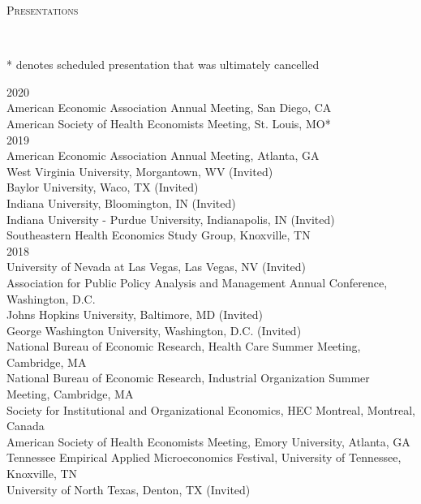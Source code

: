 \documentclass[9pt]{article}
\newenvironment{changemargin}[2]{%
  \begin{list}{}{%
    \setlength{\topsep}{0pt}%
    \setlength{\leftmargin}{#1}%
    \setlength{\rightmargin}{#2}%
    \setlength{\listparindent}{\parindent}%
    \setlength{\itemindent}{\parindent}%
    \setlength{\parsep}{\parskip}%
  }%
  \item[]}{\end{list}
}
\newcommand{\lineover}{
	\begin{changemargin}{-0.05in}{-0.05in}
		\vspace*{-8pt}
		\hrulefill \\
		\vspace*{-2pt}
	\end{changemargin}
}
\newcommand{\header}[1]{
	\begin{changemargin}{-0.5in}{-0.5in}
		\scshape{#1}\\
  	\lineover
	\end{changemargin}
}
\newenvironment{body} {
	\vspace*{-16pt}
	\begin{changemargin}{-0.25in}{-0.5in}
  }	
	{\end{changemargin}
}
\begin{document}
\header{Presentations}
\begin{body}
  \vspace{14pt}
  \vspace{-.05in} \scriptsize
  \hspace{-.2in} * denotes scheduled presentation that was ultimately cancelled
  \normalsize

  \hspace{-.2in} 2020 \\
  American Economic Association Annual Meeting, San Diego, CA \\
  American Society of Health Economists Meeting, St. Louis, MO* \\
  \hspace{-.2in} 2019 \\
  American Economic Association Annual Meeting, Atlanta, GA \\
  West Virginia University, Morgantown, WV (Invited) \\
  Baylor University, Waco, TX (Invited) \\
  Indiana University, Bloomington, IN (Invited) \\
  Indiana University - Purdue University, Indianapolis, IN (Invited) \\
  Southeastern Health Economics Study Group, Knoxville, TN \\
  \hspace{-.2in} 2018 \\
  University of Nevada at Las Vegas, Las Vegas, NV (Invited) \\
  Association for Public Policy Analysis and Management Annual Conference, Washington, D.C. \\
  Johns Hopkins University, Baltimore, MD (Invited) \\
  George Washington University, Washington, D.C. (Invited) \\
  National Bureau of Economic Research, Health Care Summer Meeting, Cambridge, MA \\
  National Bureau of Economic Research, Industrial Organization Summer Meeting, Cambridge, MA \\
  Society for Institutional and Organizational Economics, HEC Montreal, Montreal, Canada \\
  American Society of Health Economists Meeting, Emory University, Atlanta, GA \\
  Tennessee Empirical Applied Microeconomics Festival, University of Tennessee, Knoxville, TN \\
  University of North Texas, Denton, TX (Invited) \\

\end{body}
\end{document}
